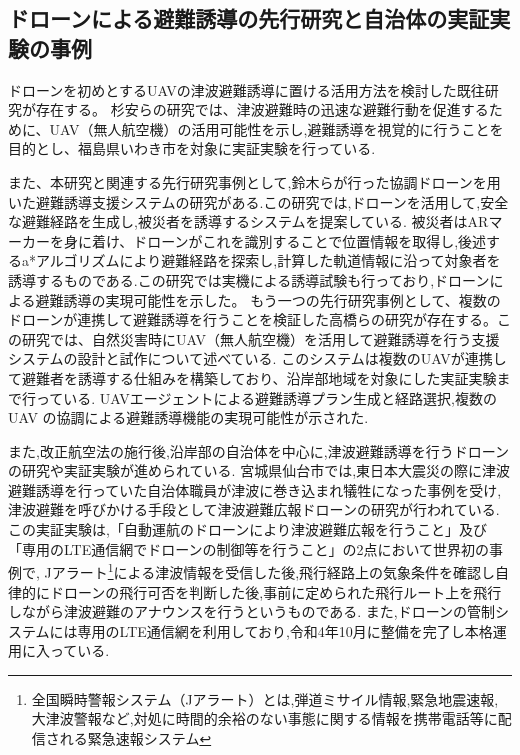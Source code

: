 \subsection{ドローンによる避難誘導の先行研究と自治体の実証実験の事例}
ドローンを初めとするUAVの津波避難誘導に置ける活用方法を検討した既往研究が存在する。
杉安らの研究では、津波避難時の迅速な避難行動を促進するために、UAV（無人航空機）の活用可能性を示し,避難誘導を視覚的に行うことを目的とし、福島県いわき市を対象に実証実験を行っている\cite{sugiyasu2018uav}.

また、本研究と関連する先行研究事例として,鈴木らが行った協調ドローンを用いた避難誘導支援システムの研究がある\cite{suzuki2020drone}.この研究では,ドローンを活用して,安全な避難経路を生成し,被災者を誘導するシステムを提案している.
被災者はARマーカーを身に着け、ドローンがこれを識別することで位置情報を取得し,後述するa*アルゴリズムにより避難経路を探索し,計算した軌道情報に沿って対象者を誘導するものである.この研究では実機による誘導試験も行っており,ドローンによる避難誘導の実現可能性を示した。
もう一つの先行研究事例として、複数のドローンが連携して避難誘導を行うことを検証した高橋らの研究が存在する\cite{takahashi2018uav}。この研究では、自然災害時にUAV（無人航空機）を活用して避難誘導を行う支援システムの設計と試作について述べている.
このシステムは複数のUAVが連携して避難者を誘導する仕組みを構築しており、沿岸部地域を対象にした実証実験まで行っている. UAVエージェントによる避難誘導プラン生成と経路選択,複数の UAV の協調による避難誘導機能の実現可能性が示された.\par

また,改正航空法の施行後,沿岸部の自治体を中心に,津波避難誘導を行うドローンの研究や実証実験が進められている.
宮城県仙台市では,東日本大震災の際に津波避難誘導を行っていた自治体職員が津波に巻き込まれ犠牲になった事例を受け,津波避難を呼びかける手段として津波避難広報ドローンの研究が行われている\cite{sendai_tsunami_drone}.この実証実験は,「自動運航のドローンにより津波避難広報を行うこと」及び「専用のLTE通信網でドローンの制御等を行うこと」の2点において世界初の事例で,
Jアラート\footnote{全国瞬時警報システム（Jアラート）とは,弾道ミサイル情報,緊急地震速報,大津波警報など,対処に時間的余裕のない事態に関する情報を携帯電話等に配信される緊急速報システム}による津波情報を受信した後,飛行経路上の気象条件を確認し自律的にドローンの飛行可否を判断した後,事前に定められた飛行ルート上を飛行しながら津波避難のアナウンスを行うというものである.
また,ドローンの管制システムには専用のLTE通信網を利用しており,令和4年10月に整備を完了し本格運用に入っている.\par


